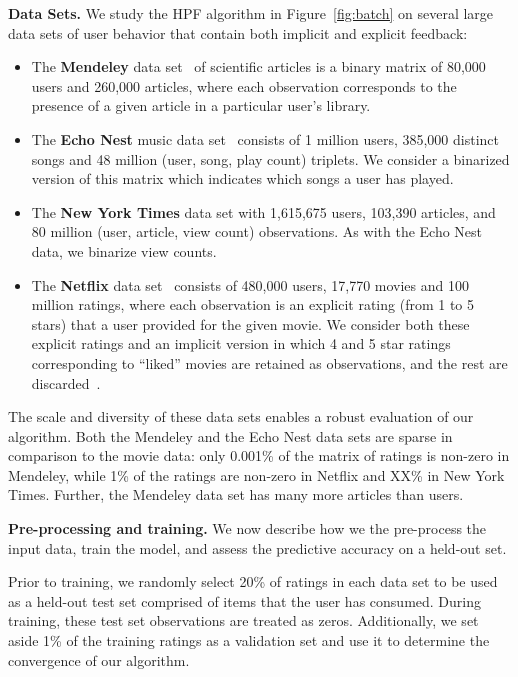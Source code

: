 {\bf Data Sets.} We study the HPF algorithm in Figure~\ref{fig:batch}
on several large data sets of user behavior that contain both implicit
and explicit feedback:
\begin{itemize}
\item The {\bf Mendeley} data set~\cite{Jack:2010} of scientific
  articles is a binary matrix of 80,000 users and 260,000 articles,
  where each observation corresponds to the presence of a given
  article in a particular user's library.
\item The {\bf Echo Nest} music data set~\cite{Bertin-Mahieux:2011}
  consists of 1 million users, 385,000 distinct songs and 48 million
  (user, song, play count) triplets. We consider a binarized version
  of this matrix which indicates which songs a user has played.
\item The {\bf New York Times} data set with 1,615,675 users, 103,390
  articles, and 80 million (user, article, view count)
  observations. As with the Echo Nest data, we binarize view counts.
\item The {\bf Netflix} data set~\cite{Koren:2009} consists of 480,000
  users, 17,770 movies and 100 million ratings, where each observation
  is an explicit rating (from 1 to 5 stars) that a user provided for
  the given movie. We consider both these explicit ratings and an
  implicit version in which 4 and 5 star ratings corresponding to
  ``liked'' movies are retained as observations, and the rest are
  discarded~\cite{Paquet:2013p9197}.
\end{itemize}

The scale and diversity of these data sets enables a robust evaluation
of our algorithm. Both the Mendeley and the Echo Nest data sets are
sparse in comparison to the movie data: only 0.001\% of the matrix of
ratings is non-zero in Mendeley, while 1\% of the ratings are non-zero
in Netflix and XX\% in New York Times. Further, the Mendeley data set has
many more articles than users.


{\bf Pre-processing and training.} We now describe how we the
pre-process the input data, train the model, and assess the predictive
accuracy on a held-out set.

Prior to training, we randomly select 20\% of ratings in each data set
to be used as a held-out test set comprised of items that the user
has consumed. During training, these test set observations are treated
as zeros. Additionally, we set aside 1\% of the training ratings as a
validation set and use it to determine the convergence of our
algorithm.

